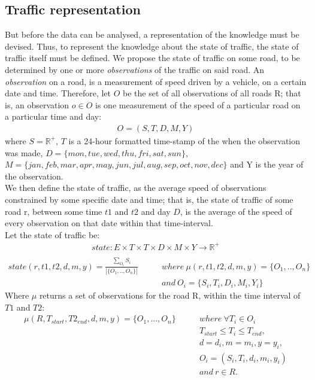 \subsection{Traffic representation}
But before the data can be analysed, a representation of the knowledge must be devised. Thus, to represent the knowledge about the state of traffic, the state of traffic itself must be defined. We propose the state of traffic on some road, to be determined by one or more \emph{observations} of the traffic on said road. An \emph{observation} on a road, is a measurement of speed driven by a vehicle, on a certain date and time. Therefore, let $O$ be the set of all observations of all roads R; that is, an observation $o \in O$ is one measurement of the speed of a particular road on a particular time and day:
\begin{align*}
O = (S, T, D, M, Y)
\end{align*}
where $S = \mathbb R^{+}$, $T$ is a 24-hour formatted time-stamp of the when the observation was made, $D= \{mon, tue, wed, thu, fri, sat, sun\}$,\\ $M = \{jan, feb, mar, apr, may, jun, jul, aug, sep, oct, nov, dec\}$ and Y is the year of the observation. \\
We then define the state of traffic, as the average speed of observations constrained by some specific date and time; that is, the state of traffic of some road r, between some time $t1$ and $t2$ and day $D$, is the average of the speed of every observation on that date within that time-interval.\\
Let the state of traffic be:
\begin{align*}
state: E \times T \times T \times D \times M \times Y \rightarrow \mathbb R^+\\
\end{align*}
\begin{align*}
state(r, t1, t2, d, m, y) = \frac{\sum\limits_{O_i} S_i}{|\{O_1,..,O_n\}|} \qquad 
&where \: \mu (r,t1,t2, d, m, y) = \{O_1,..,O_n\} \\
&and \: O_i=\{S_i, T_i, D_i, M_i, Y_i\}
\end{align*}
Where $\mu$ returns a set of observations for the road R, within the time interval of $T1$ and $T2$:
\begin{align*}
\mu(R,T_{start},T2_{end}, d, m, y) = \{O_1,...,O_n\} \qquad &where \: \forall T_i \in O_i\\
&T_{start} \leq T_i \leq T_{end}, \\
&d = d_i, m = m_i, y = y_i, \\
&O_i = (S_i, T_i, d_i, m_i, y_i) \\
&and \: r \in R.\\
\end{align*}